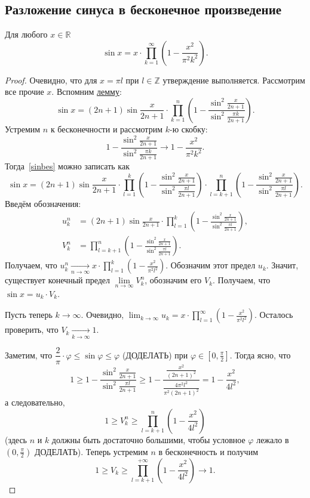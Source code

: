 \subsection{Разложение синуса в бесконечное произведение}

\begin{theorem}
	Для любого \(x \in \mathbb{R}\) \[
		\sin x = x \cdot \prod_{k=1}^{\infty} \left(1 - \frac{x^2}{\pi^2 k^2} \right).
	\]
\end{theorem}
\begin{proof}
	Очевидно, что для \(x = \pi l\) при \(l \in \mathbb{Z}\) утверждение выполняется. Рассмотрим все прочие \(x\). Вспомним \hyperlink{sinlem}{лемму}:
	\begin{equation} \label{sinbes}
		\sin x = (2n + 1) \sin \frac{x}{2n + 1} \cdot \prod_{k=1}^{n} \left(1 - \frac{\sin^2 \frac{x}{2n + 1}}{\sin^2 \frac{\pi k}{2n + 1}} \right).
	\end{equation}
	Устремим \(n\) к бесконечности и рассмотрим \(k\)-ю скобку: \[
		1 - \frac{\sin^2 \frac{x}{2n + 1}}{\sin^2 \frac{\pi k}{2n + 1}} \to 1 - \frac{x^2}{\pi^2 k^2}.
	\]
	Тогда~\eqref{sinbes} можно записать как \[
		\sin x = (2n + 1) \sin \frac{x}{2n + 1} \cdot \prod_{l=1}^{k} \left(1 - \frac{\sin^2 \frac{x}{2n + 1}}{\sin^2 \frac{\pi l}{2n + 1}} \right) \cdot \prod_{l=k+1}^{n} \left(1 - \frac{\sin^2 \frac{x}{2n + 1}}{\sin^2 \frac{\pi l}{2n + 1}} \right).
	\]
	Введём обозначения:
	\begin{align*}
		u_k^n &= (2n + 1) \sin \frac{x}{2n + 1} \cdot \prod_{l=1}^{k} \left(1 - \frac{\sin^2 \frac{x}{2n + 1}}{\sin^2 \frac{\pi l}{2n + 1}} \right), \\
		V_k^n &= \prod_{l=k+1}^{n} \left(1 - \frac{\sin^2 \frac{x}{2n + 1}}{\sin^2 \frac{\pi l}{2n + 1}} \right).
	\end{align*}
	Получаем, что \(\displaystyle u_k^n \xrightarrow[n \to \infty]{} x \cdot \prod_{l=1}^{k} \left(1 - \frac{x^2}{\pi^2 l^2} \right)\). Обозначим этот предел \(u_k\). Значит, существует конечный предел \(\lim\limits_{n \to \infty} V_k^n\), обозначим его \(V_k\). Получаем, что \(\sin x = u_k \cdot V_k\).
	
	Пусть теперь \(k \to \infty\). Очевидно, \(\displaystyle \lim_{k \to \infty} u_k = x \cdot \prod_{l=1}^{\infty} \left(1 - \frac{x^2}{\pi^2 l^2} \right)\). Осталось проверить, что \(V_k \xrightarrow[k \to \infty]{} 1\).
	
	Заметим, что \(\dfrac{2}{\pi} \cdot \varphi \leqslant \sin \varphi \leqslant \varphi\) (ДОДЕЛАТЬ) при \(\varphi \in \left[0, \frac{\pi}{2} \right]\). Тогда ясно, что \[
		1 \geqslant 1 - \frac{\sin^2 \frac{x}{2n + 1}}{\sin^2 \frac{\pi l}{2n + 1}} \geqslant 1 - \frac{\frac{x^2}{(2n + 1)^2}}{\frac{4 \pi^2 l^2}{\pi^2 (2n + 1)^2}} = 1 - \frac{x^2}{4 l^2},
	\]
	а следовательно, \[
		1 \geqslant V_k^n \geqslant \prod_{l=k+1}^{n} \left(1 - \frac{x^2}{4 l^2} \right)
	\]
	(здесь \(n\) и \(k\) должны быть достаточно большими, чтобы условное \(\varphi\) лежало в \(\left(0, \frac{\pi}{2} \right)\) ДОДЕЛАТЬ).
	Теперь устремим \(n\) в бесконечность и получим \[
		1 \geqslant V_k \geqslant \prod_{l=k+1}^{+\infty} \left(1 - \frac{x^2}{4 l^2} \right) \to 1.
	\]
\end{proof}

